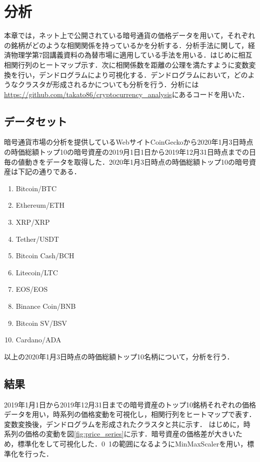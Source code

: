 \documentclass{jsarticle}
\begin{document}
	\section{分析}
	本章では，ネット上で公開されている暗号通貨の価格データを用いて，それぞれの銘柄がどのような相関関係を持っているかを分析する．分析手法に関して，経済物理学第7回講義資料の為替市場に適用している手法を用いる．はじめに相互相関行列のヒートマップ示す．次に相関係数を距離の公理を満たすように変数変換を行い，デンドログラムにより可視化する．デンドログラムにおいて，どのようなクラスタが形成されるかについても分析を行う．分析には\url{https://github.com/takato86/cryptocurrency_analysis}にあるコードを用いた．
	\subsection{データセット}
	暗号通貨市場の分析を提供しているWebサイトCoinGeckoから2020年1月3日時点の時価総額トップ10の暗号資産の2019月1日1日から2019年12月31日時点までの日毎の値動きをデータを取得した．2020年1月3日時点の時価総額トップ10の暗号資産は下記の通りである．
	
	\begin{enumerate}
		\item Bitcoin/BTC
		\item Ethereum/ETH
		\item XRP/XRP
		\item Tether/USDT
		\item Bitcoin Cash/BCH
		\item Litecoin/LTC
		\item EOS/EOS
		\item Binance Coin/BNB
		\item Bitcoin SV/BSV
		\item Cardano/ADA
	\end{enumerate}

	以上の2020年1月3日時点の時価総額トップ10名柄について，分析を行う．
	
	\subsection{結果}
	2019年1月1日から2019年12月31日までの暗号資産のトップ10銘柄それぞれの価格データを用い，時系列の価格変動を可視化し，相関行列をヒートマップで表す．変数変換後，デンドログラムを形成されたクラスタと共に示す．
	はじめに，時系列の価格の変動を図\ref{fig:price_series}に示す．暗号資産の価格差が大きいため，標準化をして可視化した．0~1の範囲になるようにMinMaxScalerを用い，標準化を行った．
	
\end{document}

